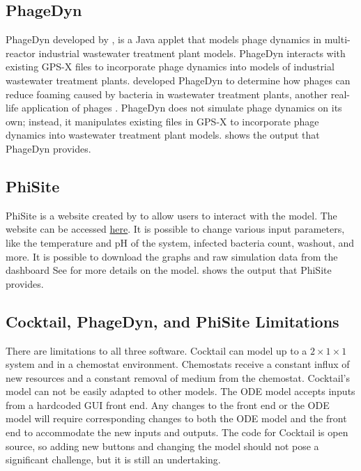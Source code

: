 \subsection{PhageDyn}
PhageDyn developed by \cite{krysiak-baltynSimulationPhageDynamics2017}, is a Java applet that models phage dynamics in multi-reactor industrial wastewater treatment plant models. 
PhageDyn interacts with existing GPS-X \cite{AdvancedWastewaterModelling} files to incorporate phage dynamics into models of industrial wastewater treatment plants. 
\citet{krysiak-baltynSimulationPhageDynamics2017} developed PhageDyn to determine how phages can reduce foaming caused by bacteria in wastewater treatment plants, another real-life application of phages \cite{heardEffectFilamentousBacteria2008}. 
PhageDyn does not simulate phage dynamics on its own; instead, it manipulates existing files in GPS-X to incorporate phage dynamics into wastewater treatment plant models. 
 shows the output that PhageDyn provides. 

\subsection{PhiSite}
PhiSite is a website created by \citet{bekeModellingInteractionBacteriophages2016} to allow users to interact with the \citet{schragHostParasiteCoexistenceRole1996} model. 
The website can be accessed \href{http://dublin.embnet.sk:3838/model/}{here}. 
It is possible to change various input parameters, like the temperature and pH of the system, infected bacteria count, washout, and more. 
It is possible to download the graphs and raw simulation data from the dashboard
See  for more details on the model. 
 shows the output that PhiSite provides. 

\subsection{Cocktail, PhageDyn, and PhiSite Limitations}
\label{sec:literature:cocktail_and_phagedyn_limitations}
There are limitations to all three software. 
Cocktail can model up to a $2\times 1 \times 1$ system and in a chemostat environment. 
Chemostats receive a constant influx of new resources and a constant removal of medium from the chemostat. 
Cocktail's model can not be easily adapted to other models. 
The ODE model accepts inputs from a hardcoded GUI front end. 
Any changes to the front end or the ODE model will require corresponding changes to both the ODE model and the front end to accommodate the new inputs and outputs. 
The code for Cocktail is open source, so adding new buttons and changing the model should not pose a significant challenge, but it is still an undertaking. 


